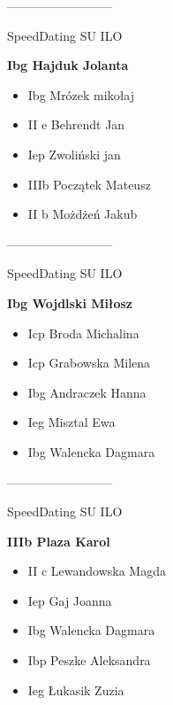 \documentclass[a4paper,10pt]{article}
\begin{document}
\begin{multicols}{3}
\begin{minipage}[l]{\textwidth}
\end{minipage}



\begin{minipage}[l]{\textwidth}
--------------------------

  \footnotesize{SpeedDating SU ILO}

  \bfseries{Ibg Hajduk Jolanta}

  \begin{itemize}
    \item Ibg Mrózek mikołaj
    \item II e Behrendt Jan
    \item Iep Zwoliński jan
    \item IIIb Początek Mateusz
    \item II b Możdżeń Jakub

    \end{itemize}



\end{minipage}



\begin{minipage}[l]{\textwidth}
--------------------------

  \footnotesize{SpeedDating SU ILO}

  \bfseries{Ibg Wojdlski Miłosz}

  \begin{itemize}
    \item Icp Broda Michalina
    \item Icp Grabowska Milena
    \item Ibg Andraczek Hanna
    \item Ieg Misztal Ewa
    \item Ibg Walencka Dagmara

    \end{itemize}



\end{minipage}



\begin{minipage}[l]{\textwidth}
--------------------------

  \footnotesize{SpeedDating SU ILO}

  \bfseries{IIIb Plaza Karol}

  \begin{itemize}
    \item II c Lewandowska Magda
    \item Iep Gaj Joanna
    \item Ibg Walencka Dagmara
    \item Ibp Peszke Aleksandra
    \item Ieg Łukasik Zuzia


\end{itemize}
\end{minipage}
\end{multicols}
\end{document}
